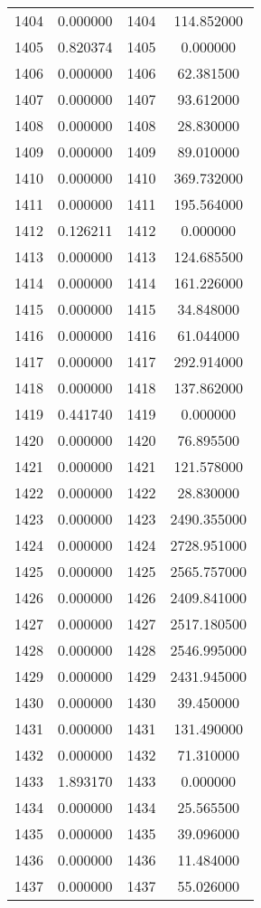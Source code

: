 \documentclass[12pt]{article}
\begin{document}
\begin{longtable}{@{}cccc@{}}
1404 & 0.000000 & 1404 & 114.852000 \\
1405 & 0.820374 & 1405 & 0.000000 \\
1406 & 0.000000 & 1406 & 62.381500 \\
1407 & 0.000000 & 1407 & 93.612000 \\
1408 & 0.000000 & 1408 & 28.830000 \\
1409 & 0.000000 & 1409 & 89.010000 \\
1410 & 0.000000 & 1410 & 369.732000 \\
1411 & 0.000000 & 1411 & 195.564000 \\
1412 & 0.126211 & 1412 & 0.000000 \\
1413 & 0.000000 & 1413 & 124.685500 \\
1414 & 0.000000 & 1414 & 161.226000 \\
1415 & 0.000000 & 1415 & 34.848000 \\
1416 & 0.000000 & 1416 & 61.044000 \\
1417 & 0.000000 & 1417 & 292.914000 \\
1418 & 0.000000 & 1418 & 137.862000 \\
1419 & 0.441740 & 1419 & 0.000000 \\
1420 & 0.000000 & 1420 & 76.895500 \\
1421 & 0.000000 & 1421 & 121.578000 \\
1422 & 0.000000 & 1422 & 28.830000 \\
1423 & 0.000000 & 1423 & 2490.355000 \\
1424 & 0.000000 & 1424 & 2728.951000 \\
1425 & 0.000000 & 1425 & 2565.757000 \\
1426 & 0.000000 & 1426 & 2409.841000 \\
1427 & 0.000000 & 1427 & 2517.180500 \\
1428 & 0.000000 & 1428 & 2546.995000 \\
1429 & 0.000000 & 1429 & 2431.945000 \\
1430 & 0.000000 & 1430 & 39.450000 \\
1431 & 0.000000 & 1431 & 131.490000 \\
1432 & 0.000000 & 1432 & 71.310000 \\
1433 & 1.893170 & 1433 & 0.000000 \\
1434 & 0.000000 & 1434 & 25.565500 \\
1435 & 0.000000 & 1435 & 39.096000 \\
1436 & 0.000000 & 1436 & 11.484000 \\
1437 & 0.000000 & 1437 & 55.026000 \\

\end{longtable}
\end{document}
